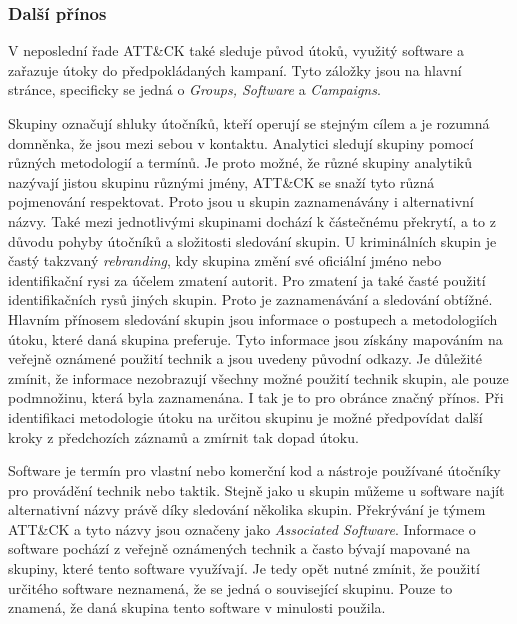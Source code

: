 \subsubsection{Další přínos}
V neposlední řade ATT\&CK také sleduje původ útoků, využitý software a zařazuje útoky do předpokládaných kampaní.
Tyto záložky jsou na hlavní stránce, specificky se jedná o \textit{Groups, Software} a \textit{Campaigns}.

Skupiny označují shluky útočníků, kteří operují se stejným cílem a je rozumná domněnka, že jsou mezi sebou v kontaktu.
Analytici sledují skupiny pomocí různých  metodologií a termínů.
Je proto možné, že různé skupiny analytiků nazývají jistou skupinu různými jmény, ATT\&CK se snaží tyto různá pojmenování respektovat.
Proto jsou u skupin zaznamenávány i alternativní názvy.
Také mezi jednotlivými skupinami dochází k částečnému překrytí, a to z důvodu pohyby útočníků a složitosti sledování skupin.
U kriminálních skupin je častý takzvaný \textit{rebranding}, kdy skupina změní své oficiální jméno nebo identifikační rysi za účelem zmatení autorit.
Pro zmatení ja také časté použití identifikačních rysů jiných skupin.
Proto je zaznamenávání a sledování obtížné.
Hlavním přínosem sledování skupin jsou informace o postupech a metodologiích útoku, které daná skupina preferuje.
Tyto informace jsou získány mapováním na veřejně oznámené použití technik a jsou uvedeny původní odkazy.
Je důležité zmínit, že informace nezobrazují všechny možné použití technik skupin, ale pouze podmnožinu, která byla zaznamenána.
I tak je to pro obránce značný přínos.
Při identifikaci metodologie útoku na určitou skupinu je možné předpovídat další kroky z předchozích záznamů a zmírnit tak dopad útoku.\cite{Mitre_groups}


Software je termín pro vlastní nebo komerční kod a nástroje používané útočníky pro provádění technik nebo taktik.
Stejně jako u skupin můžeme u software najít alternativní názvy právě díky sledování několika skupin.
Překrývání je týmem ATT\&CK a tyto názvy jsou označeny jako \textit{Associated Software}.
Informace o software pochází z veřejně oznámených technik a často bývají mapované na skupiny, které tento software využívají.
Je tedy opět nutné zmínit, že použití určitého software neznamená, že se jedná o související skupinu.
Pouze to znamená, že daná skupina tento software v minulosti použila.\cite{Mitre_software}


